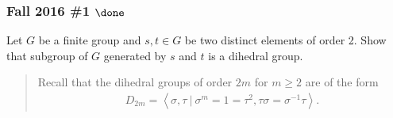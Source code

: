 \hypertarget{fall-2016-1-done}{%
\subsubsection{\texorpdfstring{Fall 2016 \#1
\(\done\)}{Fall 2016 \#1 \textbackslash done}}\label{fall-2016-1-done}}

Let \(G\) be a finite group and \(s, t\in G\) be two distinct elements
of order 2. Show that subgroup of \(G\) generated by \(s\) and \(t\) is
a dihedral group.

\begin{quote}
Recall that the dihedral groups of order \(2m\) for \(m\geq 2\) are of
the form
\begin{align*}
D_{2m} = \left\langle{\sigma, \tau {~\mathrel{\Big|}~}\sigma^m = 1 = \tau^2, \tau \sigma = \sigma^{-1}\tau}\right\rangle
.\end{align*}
\end{quote}

